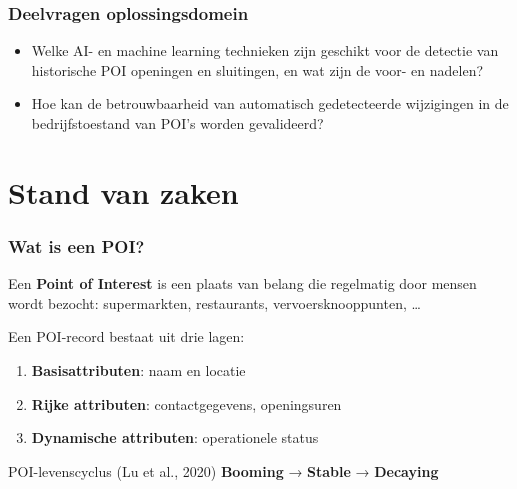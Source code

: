 \documentclass[aspectratio=169]{beamer}
\begin{document}
    \begin{frame}
        \frametitle{Deelvragen oplossingsdomein}
        
        \begin{itemize}
            \item Welke AI- en machine learning technieken zijn geschikt voor de detectie van historische POI openingen en sluitingen, en wat zijn de voor- en nadelen?
            \item Hoe kan de betrouwbaarheid van automatisch gedetecteerde wijzigingen in de bedrijfstoestand van POI's worden gevalideerd?
        \end{itemize}
        
    \end{frame}
    
    \section{Stand van zaken}
    
    \begin{frame}
        \frametitle{Wat is een POI?}
        
        Een \textbf{Point of Interest} is een plaats van belang die regelmatig door mensen wordt bezocht: supermarkten, restaurants, vervoersknooppunten, \ldots
        
        \vspace{0.5em}
        Een POI-record bestaat uit drie lagen:
        \begin{enumerate}
            \item \textbf{Basisattributen}: naam en locatie
            \item \textbf{Rijke attributen}: contactgegevens, openingsuren
            \item \textbf{Dynamische attributen}: operationele status
        \end{enumerate}
        
        \vspace{0.5em}
        \begin{block}{POI-levenscyclus (Lu et al., 2020)}
            \textbf{Booming} → \textbf{Stable} → \textbf{Decaying}
        \end{block}
        
    \end{frame}
    
\end{document}
